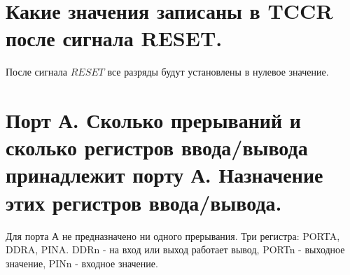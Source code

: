 \section{Какие значения записаны в TCCR после сигнала RESET.}
После сигнала $RESET$ все разряды будут установлены в нулевое значение.

\section{Порт А. Сколько прерываний и сколько регистров ввода/вывода принадлежит порту А. Назначение этих регистров ввода/вывода.}

Для порта А не предназначено ни одного прерывания. Три регистра: PORTA, DDRA, PINA.
DDRn - на вход или выход работает вывод, PORTn - выходное значение, PINn - входное значение.


